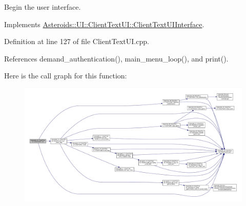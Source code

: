 Begin the user interface. 



Implements \hyperlink{classAsteroids_1_1UI_1_1ClientTextUI_1_1ClientTextUIInterface_a9eba8946cd9262221e8b55cea4acd92d}{Asteroids\+::\+U\+I\+::\+Client\+Text\+U\+I\+::\+Client\+Text\+U\+I\+Interface}.



Definition at line 127 of file Client\+Text\+U\+I.\+cpp.



References demand\+\_\+authentication(), main\+\_\+menu\+\_\+loop(), and print().

Here is the call graph for this function\+:
\nopagebreak
\begin{figure}[H]
\begin{center}
\leavevmode
\includegraphics[width=350pt]{classAsteroids_1_1UI_1_1ClientTextUI_1_1ClientTextUI_a835f455a627e77a5ef99661350281ec3_cgraph}
\end{center}
\end{figure}
\mbox{\label{classAsteroids_1_1UI_1_1ClientTextUI_1_1ClientTextUI_ab0a3f9e22046b77a85dc7771d3502365}} 
